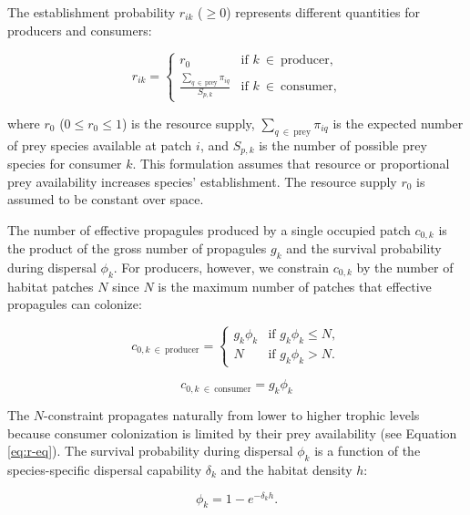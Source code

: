 \documentclass[11pt, class=article, crop=false]{standalone}
\begin{document}
The establishment probability $r_{ik}$ ($\ge 0$) represents different quantities for producers and consumers:

\begin{equation}
    r_{ik} =
    \begin{cases}
    r_{0} & \text{if $k~\in~\text{producer}$,}\\
    \frac{\sum_{q~\in~\text{prey}} \pi_{iq}}{S_{p, k}} & \text{if $k~\in~\text{consumer}$,}
    \end{cases}
    \label{eq:r-eq}
\end{equation}

where $r_0$ ($0 \le r_0 \le 1$) is the resource supply, $\sum_{q~\in~\text{prey}} \pi_{iq}$ is the expected number of prey species available at patch $i$, and $S_{p, k}$ is the number of possible prey species for consumer $k$.
This formulation assumes that resource or proportional prey availability increases species' establishment.
The resource supply $r_0$ is assumed to be constant over space.

The number of effective propagules produced by a single occupied patch $c_{0, k}$ is the product of the gross number of propagules $g_{k}$ and the survival probability during dispersal $\phi_k$.
For producers, however, we constrain $c_{0, k}$ by the number of habitat patches $N$ since $N$ is the maximum number of patches that effective propagules can colonize:

\begin{equation}
    c_{0, k~\in~\text{producer}} = 
    \begin{cases}
        g_k \phi_k & \text{if $g_k \phi_k \le N$},\\
        N & \text{if $g_k \phi_k > N$}.
    \end{cases}
    \label{eq:c0-prod}
\end{equation}


\begin{equation}
    c_{0, k~\in~\text{consumer}} = g_k \phi_k
    \label{eq:c0-con}
\end{equation}

The $N$-constraint propagates naturally from lower to higher trophic levels because consumer colonization is limited by their prey availability (see Equation \ref{eq:r-eq}).
The survival probability during dispersal $\phi_k$ is a function of the species-specific dispersal capability $\delta_k$ and the habitat density $h$:

\begin{equation}
    \phi_k = 1 - e^{-\delta_k h}.
    \label{eq:phi}
\end{equation}
\end{document}
